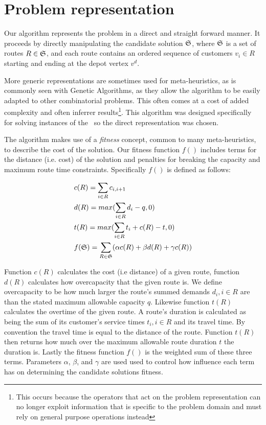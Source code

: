 \section{Problem representation}
\label{sec:problemrepresentation}

Our algorithm represents the problem in a direct and straight forward manner. It proceeds by directly manipulating the candidate solution $\mathfrak{S}$, where $\mathfrak{S}$ is a set of routes $R \in \mathfrak{S}$, and each route contains an ordered sequence of customers $v_i \in R$ starting and ending at the depot vertex $v^d$.


More generic representations are sometimes used for meta-heuristics, as is commonly seen with Genetic Algorithms, as they allow the algorithm to be easily adapted to other combinatorial problems. This often comes at a cost of added complexity and often inferrer results\footnote{This occurs because the operators that act on the problem representation can no longer exploit information that is specific to the problem domain and must rely on general purpose operations instead}. This algorithm was designed specifically for solving instances of the \VRP\ so the direct representation was chosen. 

The algorithm makes use of a \emph{fitness} concept, common to many meta-heuristics, to describe the cost of the solution. Our fitness function $f()$ includes terms for the distance (i.e. cost) of the solution and penalties for breaking the capacity and maximum route time constraints. Specifically $f()$ is defined as follows:

\begin{align}
   & c(R) = \sum_{i \in R} c_{i, i+1} \\
   & d(R) = max( \sum_{i \in R} d_i - q, 0 )  \\
   & t(R) = max( \sum_{i \in R} t_i + c(R) - t, 0 )  \\
   & f(\mathfrak{S}) = \sum_{R \in \mathfrak{S}} (\alpha c(R) + \beta d(R) + \gamma c(R))
\end{align}

Function $c(R)$ calculates the cost (i.e distance) of a given route, function $d(R)$ calculates how overcapacity that the given route is. We define overcapacity to be how much larger the route's summed demands $d_i, i \in R$ are than the stated maximum allowable capacity $q$. Likewise function $t(R)$ calculates the overtime of the given route. A route's duration is calculated as being the sum of its customer's service times $t_i, i \in R$ and its travel time. By convention the travel time is equal to the distance of the route. Function $t(R)$ then returns how much over the maximum allowable route duration $t$ the duration is. Lastly the fitness function $f()$ is the weighted sum of these three terms. Parameters $\alpha$, $\beta$, and $\gamma$ are used  used to control how influence each term has on determining the candidate solutions fitness.

